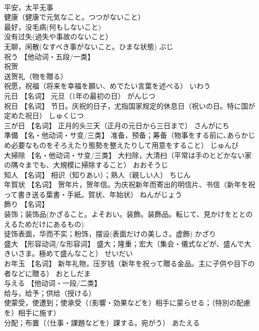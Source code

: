 \documentclass[8pt]{extreport}
\begin{document}
\begin{CJK}{UTF8}{min}
\\	平安，太平无事 
\\	健康（健康で元気なこと。つつがないこと） 
\\	最好，没毛病(何もしないこと) 
\\	没有过失(過失や事故のないこと） 
\\	无聊，闲散(なすべき事がないこと。ひまな状態)	ぶじ	
\\	祝う	【他动词・五段/一类】 
\\	祝贺 
\\	送贺礼（物を贈る） 
\\	祝愿，祝福（将来を幸福を願い、めでたい言葉を述べる）	いわう	
\\	元日	【名词】 元旦（1年の最初の日）	がんじつ	
\\	祝日	【名词】 节日。庆祝的日子，尤指国家规定的休息日（祝いの日。特に国が定めた祝日）	しゅくじつ	
\\	三が日	【名词】 正月的头三天（正月の元日から三日まで）	さんがにち	
\\	準備	【名・他动词・サ变/三类】 准备，预备；筹备（物事をする前に､あらかじめ必要なものをそろえたり態勢を整えたりして用意をすること）	じゅんび	
\\	大掃除	【名・他动词・サ变/三类】 大扫除，大清扫（平常は手のとどかない家の隅々までも、大規模に掃除すること）	おおそうじ	
\\	知人	【名词】 相识（知りあい）；熟人（親しい人）	ちじん	
\\	年賀状	【名词】 贺年片，贺年信。为庆祝新年而寄出的明信片、书信（新年を祝って書き送る葉書・手紙。賀状、年始状）	ねんがじょう	
\\	飾り	【名词】 
\\	装饰；装饰品(かざること。よそおい。装飾。装飾品。転じて、見かけをととのえるためだけにあるもの) 
\\	徒饰表面，华而不实；粉饰，摆设(表面だけの美しさ。虚飾)	かざり	
\\	盛大	【形容动词/な形容词】 盛大；隆重；宏大（集会・儀式などが、盛んで大きいさま。極めて盛んなこと）	せいだい	
\\	お年玉	【名词】 新年礼物，压岁钱（新年を祝って贈る金品。主に子供や目下の者などに贈る）	おとしだま	
\\	与える	【他动词・一段/二类】 
\\	给与，给予；供给（授ける） 
\\	使蒙受，使遭到；使承受（（影響・効果などを）相手に蒙らせる；（特別の配慮を）相手に施す） 
\\	分配；布置（（仕事・課題などを）課する。宛がう）	あたえる	

\end{CJK}
\end{document}
